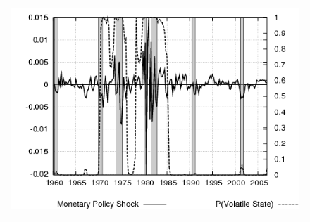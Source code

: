 \documentclass[12pt]{article}
\begin{document}
\begin{figure}[ht]
\begin{center}
\begin{tabular}{c}
\includegraphics[scale=0.5]{results_cg_wlsinit/mpshock.png} 
\end{tabular}
\end{center}
\end{figure}
\end{document}
